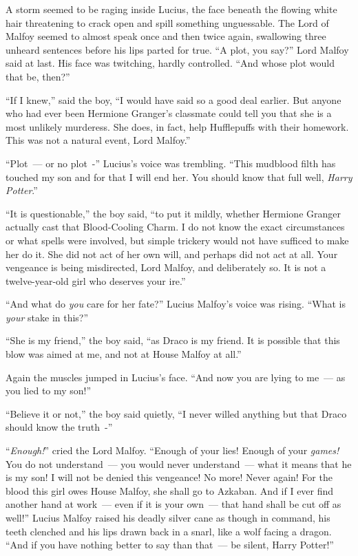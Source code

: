 A storm seemed to be raging inside Lucius, the face beneath the flowing white hair threatening to crack open and spill something unguessable. The Lord of Malfoy seemed to almost speak once and then twice again, swallowing three unheard sentences before his lips parted for true. ``A plot, you say?'' Lord Malfoy said at last. His face was twitching, hardly controlled. ``And whose plot would that be, then?''

``If I knew,'' said the boy, ``I would have said so a good deal earlier. But anyone who had ever been Hermione Granger's classmate could tell you that she is a most unlikely murderess. She does, in fact, help Hufflepuffs with their homework. This was not a natural event, Lord Malfoy.''

``Plot~--- or no plot~-'' Lucius's voice was trembling. ``This mudblood filth has touched my son and for that I will end her. You should know that full well, \emph{Harry Potter}.''

``It is questionable,'' the boy said, ``to put it mildly, whether Hermione Granger actually cast that Blood-Cooling Charm. I do not know the exact circumstances or what spells were involved, but simple trickery would not have sufficed to make her do it. She did not act of her own will, and perhaps did not act at all. Your vengeance is being misdirected, Lord Malfoy, and deliberately so. It is not a twelve-year-old girl who deserves your ire.''

``And what do \emph{you} care for her fate?'' Lucius Malfoy's voice was rising. ``What is \emph{your} stake in this?''

``She is my friend,'' the boy said, ``as Draco is my friend. It is possible that this blow was aimed at me, and not at House Malfoy at all.''

Again the muscles jumped in Lucius's face. ``And now you are lying to me~--- as you lied to my son!''

``Believe it or not,'' the boy said quietly, ``I never willed anything but that Draco should know the truth~-''

``\emph{Enough!}'' cried the Lord Malfoy. ``Enough of your lies! Enough of your \emph{games!} You do not understand~--- you would never understand~--- what it means that he is my son! I will not be denied this vengeance! No more! Never again! For the blood this girl owes House Malfoy, she shall go to Azkaban. And if I ever find another hand at work~--- even if it is your own~--- that hand shall be cut off as well!'' Lucius Malfoy raised his deadly silver cane as though in command, his teeth clenched and his lips drawn back in a snarl, like a wolf facing a dragon. ``And if you have nothing better to say than that~--- be silent, Harry Potter!''


